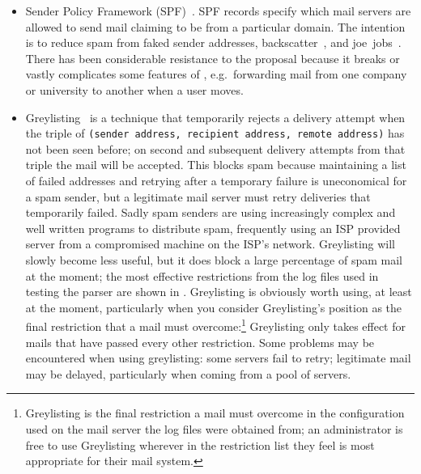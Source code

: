 \begin{itemize}

    \item Sender Policy Framework (SPF)~\cite{openspf}.  SPF\label{spf
        introduction} records specify which mail servers are allowed to
        send mail claiming to be from a particular domain.  The intention
        is to reduce spam from faked sender addresses,
        backscatter~\cite{postfix-backscatter}, and
        joe~jobs~\cite{Wikipedia-joe-job}.  There has been considerable
        resistance to the proposal because it breaks or vastly complicates
        some features of \SMTP{}, e.g.\ forwarding mail from one company or
        university to another when a user moves.

    \item Greylisting~\cite{greylisting} is a technique that temporarily
        rejects a delivery attempt when the triple of \newline{}
        \tab{}\texttt{(sender address, recipient address, remote \IP{}
        address)}\newline{} has not been seen before; on second and
        subsequent delivery attempts from that triple the mail will be
        accepted.  This blocks spam because maintaining a list of failed
        addresses and retrying after a temporary failure is uneconomical
        for a spam sender, but a legitimate mail server must retry
        deliveries that temporarily failed.  Sadly spam senders are using
        increasingly complex and well written programs to distribute spam,
        frequently using an ISP provided \SMTP{} server from a compromised
        machine on the ISP's network.  Greylisting will slowly become less
        useful, but it does block a large percentage of spam mail at the
        moment; the most effective restrictions from the
        \numberOFlogFILES{} log files used in testing the parser are shown
        in .  Greylisting is obviously
        worth using, at least at the moment, particularly when you consider
        Greylisting's position as the final restriction that a mail must
        overcome:\footnote{Greylisting is the final restriction a mail must
        overcome in the configuration used on the mail server the log files
        were obtained from; an administrator is free to use Greylisting
        wherever in the restriction list they feel is most appropriate for
        their mail system.} Greylisting only takes effect for mails that
        have passed every other restriction.  Some problems may be
        encountered when using greylisting: some servers fail to retry;
        legitimate mail may be delayed, particularly when coming from a
        pool of servers.


\end{itemize}
